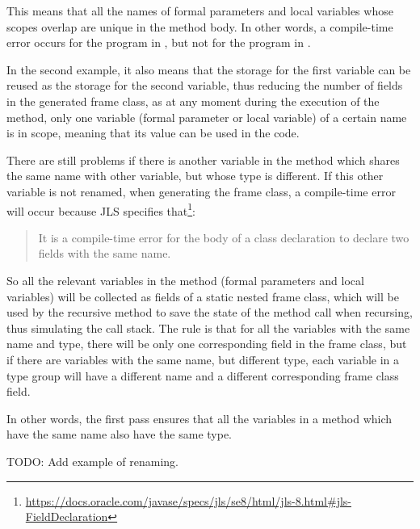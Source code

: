 This means that all the names of formal parameters and local variables whose scopes overlap are unique in the method
body. In other words, a compile-time error occurs for the program in
, but not for the program in
.


In the second example, it also means that the storage for the first  variable can be reused as the storage for
the second  variable, thus reducing the number of fields in the generated frame class, as at any moment during
the execution of the method, only one variable (formal parameter or local variable) of a certain name is in scope,
meaning that its value can be used in the code.

There are still problems if there is another variable in the method which shares the same name with other variable, but
whose type is different. If this other variable is not renamed, when generating the frame class, a compile-time error
will occur because JLS specifies that\footnote{\url{https://docs.oracle.com/javase/specs/jls/se8/html/jls-8.html#jls-FieldDeclaration}}:
\begin{quote}
    It is a compile-time error for the body of a class declaration to declare two fields with the same name.
\end{quote}

So all the relevant variables in the method (formal parameters and local variables) will be collected as fields of a
static nested frame class, which will be used by the recursive method to save the state of the method call when
recursing, thus simulating the call stack. The rule is that for all the variables with the same name and type, there
will be only one corresponding field in the frame class, but if there are variables with the same name, but different
type, each variable in a type group will have a different name and a different corresponding frame class field.

In other words, the first pass ensures that all the variables in a method which have the same name also have the same
type.

TODO: Add example of renaming.